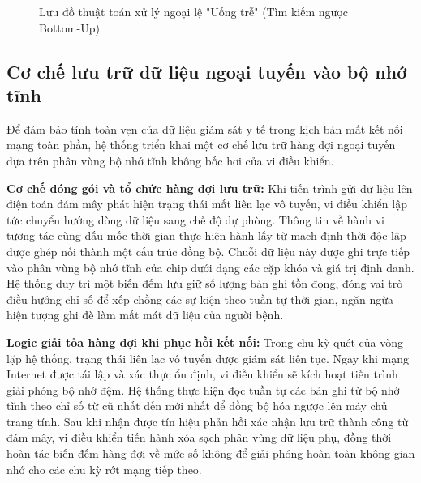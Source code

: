 \documentclass[12pt, a4paper, oneside]{article}
\begin{document}
\begin{figure}[H]
    \caption{Lưu đồ thuật toán xử lý ngoại lệ "Uống trễ" (Tìm kiếm ngược Bottom-Up)}
    \label{fig:uong_tre_flow}
\end{figure}

\subsection{Cơ chế lưu trữ dữ liệu ngoại tuyến vào bộ nhớ tĩnh}
Để đảm bảo tính toàn vẹn của dữ liệu giám sát y tế trong kịch bản mất kết nối mạng toàn phần, hệ thống triển khai một cơ chế lưu trữ hàng đợi ngoại tuyến dựa trên phân vùng bộ nhớ tĩnh không bốc hơi của vi điều khiển. 

\textbf{Cơ chế đóng gói và tổ chức hàng đợi lưu trữ:}
Khi tiến trình gửi dữ liệu lên điện toán đám mây phát hiện trạng thái mất liên lạc vô tuyến, vi điều khiển lập tức chuyển hướng dòng dữ liệu sang chế độ dự phòng. Thông tin về hành vi tương tác cùng dấu mốc thời gian thực hiện hành lấy từ mạch định thời độc lập được ghép nối thành một cấu trúc đồng bộ. Chuỗi dữ liệu này được ghi trực tiếp vào phân vùng bộ nhớ tĩnh của chip dưới dạng các cặp khóa và giá trị định danh. Hệ thống duy trì một biến đếm lưu giữ số lượng bản ghi tồn đọng, đóng vai trò điều hướng chỉ số để xếp chồng các sự kiện theo tuần tự thời gian, ngăn ngừa hiện tượng ghi đè làm mất mát dữ liệu của người bệnh.

\textbf{Logic giải tỏa hàng đợi khi phục hồi kết nối:}
Trong chu kỳ quét của vòng lặp hệ thống, trạng thái liên lạc vô tuyến được giám sát liên tục. Ngay khi mạng Internet được tái lập và xác thực ổn định, vi điều khiển sẽ kích hoạt tiến trình giải phóng bộ nhớ đệm. Hệ thống thực hiện đọc tuần tự các bản ghi từ bộ nhớ tĩnh theo chỉ số từ cũ nhất đến mới nhất để đồng bộ hóa ngược lên máy chủ trang tính. Sau khi nhận được tín hiệu phản hồi xác nhận lưu trữ thành công từ đám mây, vi điều khiển tiến hành xóa sạch phân vùng dữ liệu phụ, đồng thời hoàn tác biến đếm hàng đợi về mức số không để giải phóng hoàn toàn không gian nhớ cho các chu kỳ rớt mạng tiếp theo.
\end{document}
